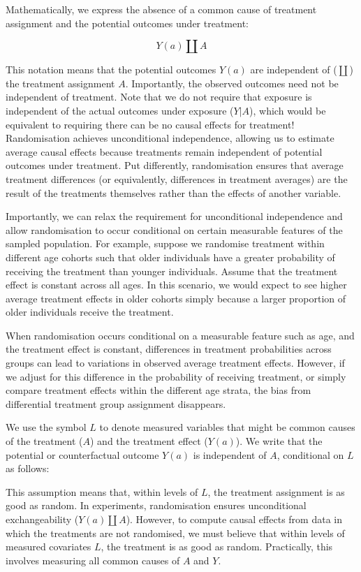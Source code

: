 \documentclass[
  singlecolumn]{article}
\begin{document}
Mathematically, we express the absence of a common cause of treatment
assignment and the potential outcomes under treatment:

\[
Y(a) \coprod A
\]

This notation means that the potential outcomes \(Y(a)\) are independent
of (\(\coprod\)) the treatment assignment \(A\). Importantly, the
observed outcomes need not be independent of treatment. Note that we do
not require that exposure is independent of the actual outcomes under
exposure (\(Y|A\)), which would be equivalent to requiring there can be
no causal effects for treatment! Randomisation achieves unconditional
independence, allowing us to estimate average causal effects because
treatments remain independent of potential outcomes under treatment. Put
differently, randomisation ensures that average treatment differences
(or equivalently, differences in treatment averages) are the result of
the treatments themselves rather than the effects of another variable.

Importantly, we can relax the requirement for unconditional independence
and allow randomisation to occur conditional on certain measurable
features of the sampled population. For example, suppose we randomise
treatment within different age cohorts such that older individuals have
a greater probability of receiving the treatment than younger
individuals. Assume that the treatment effect is constant across all
ages. In this scenario, we would expect to see higher average treatment
effects in older cohorts simply because a larger proportion of older
individuals receive the treatment.

When randomisation occurs conditional on a measurable feature such as
age, and the treatment effect is constant, differences in treatment
probabilities across groups can lead to variations in observed average
treatment effects. However, if we adjust for this difference in the
probability of receiving treatment, or simply compare treatment effects
within the different age strata, the bias from differential treatment
group assignment disappears.

We use the symbol \(L\) to denote measured variables that might be
common causes of the treatment (\(A\)) and the treatment effect
(\(Y(a)\)). We write that the potential or counterfactual outcome
\(Y(a)\) is independent of \(A\), conditional on \(L\) as follows:

This assumption means that, within levels of \(L\), the treatment
assignment is as good as random. In experiments, randomisation ensures
unconditional exchangeability (\(Y(a) \coprod  A\)). However, to compute
causal effects from data in which the treatments are not randomised, we
must believe that within levels of measured covariates \(L\), the
treatment is as good as random. Practically, this involves measuring all
common causes of \(A\) and \(Y\).
\end{document}
